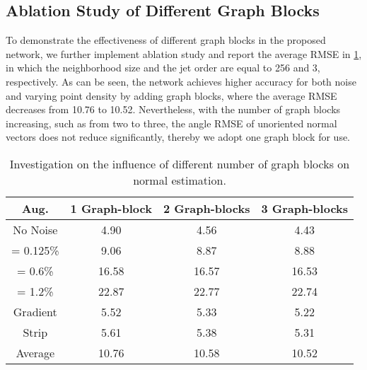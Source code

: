\documentclass[runningheads]{llncs}
\begin{document}
\subsection{Ablation Study of Different Graph Blocks}
To demonstrate the effectiveness of different graph blocks in the proposed network, we further implement ablation study and report the average RMSE in \cref{tab:graph}, in which the neighborhood size and the jet order are equal to 256 and 3, respectively. As can be seen, the network achieves higher accuracy for both noise and varying point density by adding graph blocks, where the average RMSE decreases from 10.76 to 10.52. Nevertheless, with the number of graph blocks increasing, such as from two to three, the angle RMSE of unoriented normal vectors does not reduce significantly, thereby we adopt one graph block for use.
\begin{table}[t]
\caption{Investigation on the influence of different number of graph blocks on normal estimation.}
\begin{center}
\setlength{\tabcolsep}{1mm}
\begin{tabular}{@{}cccc@{}}
\toprule
Aug.               & 1 Graph-block & 2 Graph-blocks & 3 Graph-blocks \\ \midrule
No Noise           & 4.90          & 4.56          & 4.43          \\
 = 0.125\% & 9.06          & 8.87          & 8.88          \\
 = 0.6\%   & 16.58         & 16.57         & 16.53         \\
 = 1.2\%   & 22.87         & 22.77         & 22.74         \\
Gradient           & 5.52          & 5.33          & 5.22          \\
Strip              & 5.61          & 5.38          & 5.31          \\
Average            & 10.76         & 10.58         & 10.52         \\ \bottomrule
\end{tabular}
\end{center}
\label{tab:graph}
\end{table}
\end{document}
